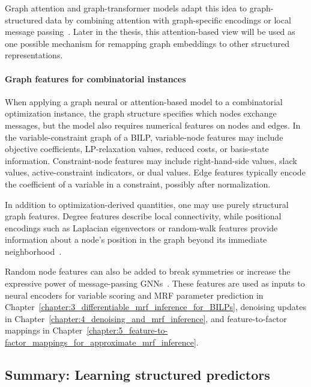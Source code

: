 Graph attention and graph-transformer models adapt this idea to graph-structured data by combining attention with graph-specific encodings or local message passing~\cite{velickovic_graph_2017,rampasek_recipe_2022}. Later in the thesis, this attention-based view will be used as one possible mechanism for remapping graph embeddings to other structured representations.



\paragraph{Graph features for combinatorial instances}

When applying a graph neural or attention-based model to a combinatorial optimization instance, the graph structure specifies which nodes exchange messages, but the model also requires numerical features on nodes and edges. In the variable-constraint graph of a BILP, variable-node features may include objective coefficients, LP-relaxation values, reduced costs, or basis-state information. Constraint-node features may include right-hand-side values, slack values, active-constraint indicators, or dual values. Edge features typically encode the coefficient of a variable in a constraint, possibly after normalization.

In addition to optimization-derived quantities, one may use purely structural graph features. Degree features describe local connectivity, while positional encodings such as Laplacian eigenvectors or random-walk features provide information about a node's position in the graph beyond its immediate neighborhood~\cite{maskey_generalized_2022,eliasof_graph_2023}. 

Random node features can also be added to break symmetries or increase the expressive power of message-passing GNNs~\cite{sato_random_2021,abboud_surprising_2021}. These features are used as inputs to neural encoders for variable scoring and MRF parameter prediction in Chapter~\ref{chapter:3_differentiable_mrf_inference_for_BILPs}, denoising updates in Chapter~\ref{chapter:4_denoising_and_mrf_inference}, and feature-to-factor mappings in Chapter~\ref{chapter:5_feature-to-factor_mappings_for_approximate_mrf_inference}.

\subsection{Summary: Learning structured predictors}

